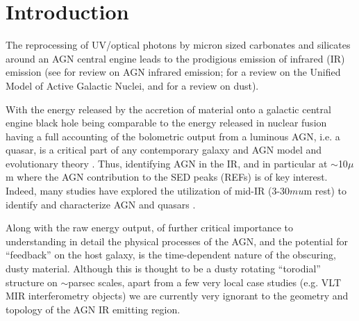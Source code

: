 \documentclass{emulateapj}
\begin{document}

\maketitle


\section{Introduction}
The reprocessing of UV/optical photons by micron sized carbonates and
silicates around an AGN central engine leads to the prodigious emission
of infrared (IR) emission (see \citet{Elitzur14} for review on AGN infrared
emission; \citet{Netzer15} for a review on the Unified Model of
Active Galactic Nuclei, and \citet[][]{Draine03} for a
review on dust).

With the energy released by the accretion of material onto a galactic
central engine black hole being comparable to the energy released in
nuclear fusion having a full accounting of the bolometric output from
a luminous AGN, i.e. a quasar, is a critical part of any contemporary
galaxy and AGN model and evolutionary theory
\citep[e.g.,][]{Rosas-Guevara2016, Bower2017, McAlpine2017,
Pillepich2017}. Thus, identifying AGN in the IR, and in particular at
$\sim$10$\mu$m where the AGN contribution to the SED peaks (REFs) is
of key interest. Indeed, many studies have explored the utilization of
mid-IR (3-30$mu$m rest) to identify and characterize AGN and quasars
\citep{Lacy04, Stern05, Martinez-Sansigre06, Richards09b, Donley12,
Stern12, Banerji13, Assef13, Richards15, Timlin16}.

Along with the raw energy output, of further critical importance to
understanding in detail the physical processes of the AGN, and the
potential for ``feedback'' on the host galaxy, is the time-dependent
nature of the obscuring, dusty material. Although this is thought to
be a dusty rotating ``torodial'' structure on $\sim$parsec scales,
apart from a few very local case studies (e.g. VLT MIR interferometry
objects) we are currently very ignorant to the geometry and topology
of the AGN IR emitting region.
\end{document}
